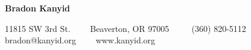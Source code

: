 \begin{center}
    {\LARGE \textbf{Bradon Kanyid}}

    11815 SW 3rd St.\ \ \textbullet
    \ \ Beaverton, OR 97005 \ \ \textbullet
    \ \ (360) 820-5112\\
    bradon@kanyid.org\ \ \textbullet
    \ \ www.kanyid.org
\end{center}

